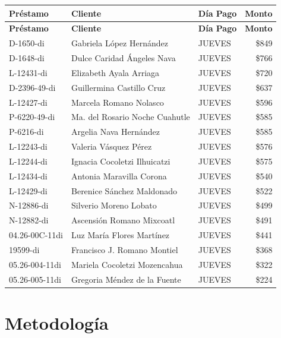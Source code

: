 \documentclass[11pt,a4paper]{article}
\newcommand{\money}[1]{\$\num{#1}}
\begin{document}
\begin{center}
\renewcommand{\arraystretch}{1.1}
\footnotesize
\begin{longtable}{lp{5.5cm}lr}
\toprule
\textbf{Pr\'estamo} & \textbf{Cliente} & \textbf{D\'ia Pago} & \textbf{Monto} \\
\midrule
\endfirsthead
\toprule
\textbf{Pr\'estamo} & \textbf{Cliente} & \textbf{D\'ia Pago} & \textbf{Monto} \\
\midrule
\endhead
D-1650-di & Gabriela L\'opez Hern\'andez & JUEVES & \money{849} \\
D-1648-di & Dulce Caridad \'Angeles Nava & JUEVES & \money{766} \\
L-12431-di & Elizabeth Ayala Arriaga & JUEVES & \money{720} \\
D-2396-49-di & Guillermina Castillo Cruz & JUEVES & \money{637} \\
L-12427-di & Marcela Romano Nolasco & JUEVES & \money{596} \\
P-6220-49-di & Ma. del Rosario Noche Cuahutle & JUEVES & \money{585} \\
P-6216-di & Argelia Nava Hern\'andez & JUEVES & \money{585} \\
L-12243-di & Valeria V\'asquez P\'erez & JUEVES & \money{576} \\
L-12244-di & Ignacia Cocoletzi Ilhuicatzi & JUEVES & \money{575} \\
L-12434-di & Antonia Maravilla Corona & JUEVES & \money{540} \\
L-12429-di & Berenice S\'anchez Maldonado & JUEVES & \money{522} \\
N-12886-di & Silverio Moreno Lobato & JUEVES & \money{499} \\
N-12882-di & Ascensi\'on Romano Mixcoatl & JUEVES & \money{491} \\
04.26-00C-11di & Luz Mar\'ia Flores Mart\'inez & JUEVES & \money{441} \\
19599-di & Francisco J. Romano Montiel & JUEVES & \money{368} \\
05.26-004-11di & Mariela Cocoletzi Mozencahua & JUEVES & \money{322} \\
05.26-005-11di & Gregoria M\'endez de la Fuente & JUEVES & \money{224} \\
\bottomrule
\end{longtable}
\end{center}

\section{Metodolog\'ia}
\end{document}
